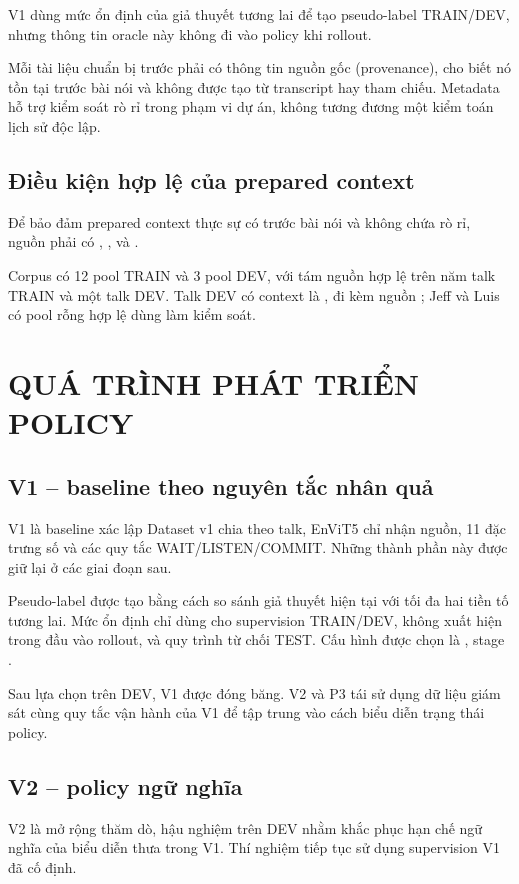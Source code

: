 \documentclass[11pt,a4paper]{article}
\numberwithin{figure}{section}
\numberwithin{table}{section}
\begin{document}
V1 dùng mức ổn định của giả thuyết tương lai để tạo pseudo-label TRAIN/DEV, nhưng thông tin oracle này không đi vào policy khi rollout.

Mỗi tài liệu chuẩn bị trước phải có thông tin nguồn gốc (provenance), cho biết nó tồn tại trước bài nói và không được tạo từ transcript hay tham chiếu. Metadata hỗ trợ kiểm soát rò rỉ trong phạm vi dự án, không tương đương một kiểm toán lịch sử độc lập.

\subsection{Điều kiện hợp lệ của prepared context}
Để bảo đảm prepared context thực sự có trước bài nói và không chứa rò rỉ, nguồn phải có , ,  và .

Corpus có 12 pool TRAIN và 3 pool DEV, với tám nguồn hợp lệ trên năm talk TRAIN và một talk DEV. Talk DEV có context là , đi kèm nguồn ; Jeff và Luis có pool rỗng hợp lệ dùng làm kiểm soát.

\section{QUÁ TRÌNH PHÁT TRIỂN POLICY}

\subsection{V1 -- baseline theo nguyên tắc nhân quả}
V1 là baseline xác lập Dataset v1 chia theo talk, EnViT5 chỉ nhận nguồn, 11 đặc trưng số và các quy tắc WAIT/LISTEN/COMMIT. Những thành phần này được giữ lại ở các giai đoạn sau.

Pseudo-label được tạo bằng cách so sánh giả thuyết hiện tại với tối đa hai tiền tố tương lai. Mức ổn định chỉ dùng cho supervision TRAIN/DEV, không xuất hiện trong đầu vào rollout, và quy trình từ chối TEST. Cấu hình được chọn là , stage .

Sau lựa chọn trên DEV, V1 được đóng băng. V2 và P3 tái sử dụng dữ liệu giám sát cùng quy tắc vận hành của V1 để tập trung vào cách biểu diễn trạng thái policy.

\subsection{V2 -- policy ngữ nghĩa}
V2 là mở rộng thăm dò, hậu nghiệm trên DEV nhằm khắc phục hạn chế ngữ nghĩa của biểu diễn thưa trong V1. Thí nghiệm tiếp tục sử dụng supervision V1 đã cố định.
\end{document}
